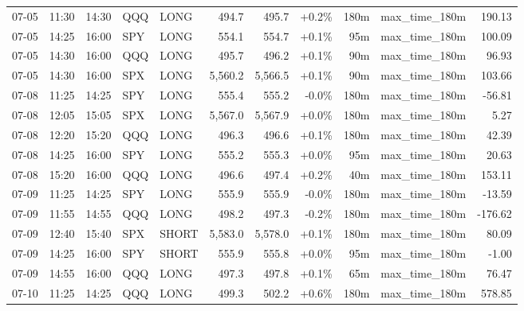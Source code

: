 \documentclass[11pt,a4paper,twoside]{article}
\begin{document}
\begin{center}
\begin{longtable}{>{\color{txtmain}}l l l l l r r r r >{\color{txtmain}}l r}
07-05 & 11:30 & 14:30 & QQQ & LONG & 494.7 & 495.7 & \textcolor{wingreen}{+0.2\%} & 180m & max\_time\_180m & \textcolor{wingreen}{190.13} \\
07-05 & 14:25 & 16:00 & SPY & LONG & 554.1 & 554.7 & \textcolor{wingreen}{+0.1\%} & 95m & max\_time\_180m & \textcolor{wingreen}{100.09} \\
07-05 & 14:30 & 16:00 & QQQ & LONG & 495.7 & 496.2 & \textcolor{wingreen}{+0.1\%} & 90m & max\_time\_180m & \textcolor{wingreen}{96.93} \\
07-05 & 14:30 & 16:00 & SPX & LONG & 5,560.2 & 5,566.5 & \textcolor{wingreen}{+0.1\%} & 90m & max\_time\_180m & \textcolor{wingreen}{103.66} \\
07-08 & 11:25 & 14:25 & SPY & LONG & 555.4 & 555.2 & \textcolor{lossred}{-0.0\%} & 180m & max\_time\_180m & \textcolor{lossred}{-56.81} \\
07-08 & 12:05 & 15:05 & SPX & LONG & 5,567.0 & 5,567.9 & \textcolor{wingreen}{+0.0\%} & 180m & max\_time\_180m & \textcolor{wingreen}{5.27} \\
07-08 & 12:20 & 15:20 & QQQ & LONG & 496.3 & 496.6 & \textcolor{wingreen}{+0.1\%} & 180m & max\_time\_180m & \textcolor{wingreen}{42.39} \\
07-08 & 14:25 & 16:00 & SPY & LONG & 555.2 & 555.3 & \textcolor{wingreen}{+0.0\%} & 95m & max\_time\_180m & \textcolor{wingreen}{20.63} \\
07-08 & 15:20 & 16:00 & QQQ & LONG & 496.6 & 497.4 & \textcolor{wingreen}{+0.2\%} & 40m & max\_time\_180m & \textcolor{wingreen}{153.11} \\
07-09 & 11:25 & 14:25 & SPY & LONG & 555.9 & 555.9 & \textcolor{lossred}{-0.0\%} & 180m & max\_time\_180m & \textcolor{lossred}{-13.59} \\
07-09 & 11:55 & 14:55 & QQQ & LONG & 498.2 & 497.3 & \textcolor{lossred}{-0.2\%} & 180m & max\_time\_180m & \textcolor{lossred}{-176.62} \\
07-09 & 12:40 & 15:40 & SPX & SHORT & 5,583.0 & 5,578.0 & \textcolor{wingreen}{+0.1\%} & 180m & max\_time\_180m & \textcolor{wingreen}{80.09} \\
07-09 & 14:25 & 16:00 & SPY & SHORT & 555.9 & 555.8 & \textcolor{wingreen}{+0.0\%} & 95m & max\_time\_180m & \textcolor{lossred}{-1.00} \\
07-09 & 14:55 & 16:00 & QQQ & LONG & 497.3 & 497.8 & \textcolor{wingreen}{+0.1\%} & 65m & max\_time\_180m & \textcolor{wingreen}{76.47} \\
07-10 & 11:25 & 14:25 & QQQ & LONG & 499.3 & 502.2 & \textcolor{wingreen}{+0.6\%} & 180m & max\_time\_180m & \textcolor{wingreen}{578.85} \\

\end{longtable}
\end{center}
\end{document}
